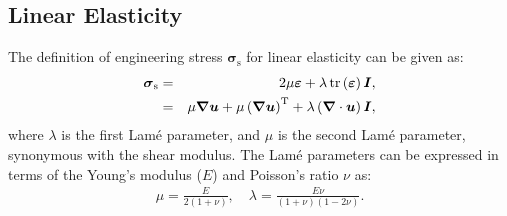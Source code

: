 \documentclass[review,3p]{elsarticle}
\newcommand{\bb}{\boldsymbol}
\begin{document}
\subsection{Linear Elasticity}
The definition of engineering stress $\bb{\sigma}_\text{s}$ for linear elasticity can be given as:
%
\begin{eqnarray}  \label{eq:linearElastic}
	\bb{\sigma}_\text{s}
	&=& 2 \mu \bb{\varepsilon} + \lambda \, \text{tr} \left( \bb{\varepsilon} \right) \bb{I} \notag, \\
	&=& \mu \bb{\nabla} \bb{u} + \mu \left( \bb{\nabla} \bb{u}\right)^{\text{T}} + \lambda \left(\bb{\nabla} \cdot \bb{u} \right) \bb{I},
\end{eqnarray}
%
where $\lambda$ is the first Lam\'{e} parameter, and $\mu$ is the second Lam\'{e} parameter, synonymous with the shear modulus.
The Lam\'{e} parameters can be expressed in terms of the Young's modulus ($E$) and Poisson's ratio $\nu$ as:
%
\begin{eqnarray}
	\mu = \frac{E}{2(1 + \nu)}, \quad \lambda = \frac{E \nu}{(1+\nu)(1 - 2\nu)}.
\end{eqnarray}
%
%
%
\end{document}
